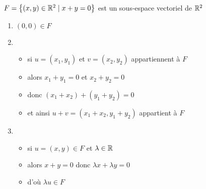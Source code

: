 \begin{frame}
\begin{exemple}
$F=\big\{(x,y)\in \mathbb{R}^2\mid x+y=0\big\}$  est un sous-espace 
  vectoriel de $\mathbb{R}^2$
  
\hfill\hfill\begin{minipage}{0.3\textwidth}
\end{minipage}
\vspace*{-13ex}
\pause
  \begin{enumerate}
    \item $(0,0) \in F$

    \pause
    
    \item 
    \begin{itemize}
      \item si $u=(x_1,y_1)$ et $v=(x_2,y_2)$ appartiennent à $F$
      \pause
      \item alors $x_1+y_1=0$ et $x_2+y_2=0$
      \pause
      \item donc $(x_1+x_2)+(y_1+y_2)=0$
      \pause
      \item et ainsi $u+v=(x_1+x_2,y_1+y_2)$ appartient à $F$
    \end{itemize}

       
    
    \pause
    
    \item
    \begin{itemize}
      \item si $u=(x,y) \in F$ et $\lambda \in \mathbb{R}$
      \item alors $x+y=0$ donc $\lambda x + \lambda y = 0$
      \item d'où $\lambda u \in F$
    \end{itemize}

  \end{enumerate}

  

\end{exemple}
\end{frame}


